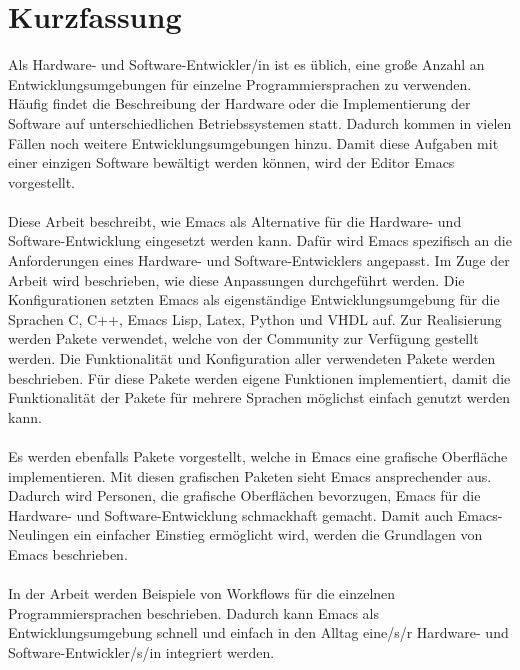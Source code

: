 \chapter{Kurzfassung}
\label{cha:kurzfassung}
Als Hardware- und Software-Entwickler/in ist es üblich, eine große
Anzahl an Entwicklungsumgebungen für einzelne Programmiersprachen zu
verwenden. Häufig findet die Beschreibung der Hardware oder die
Implementierung der Software auf unterschiedlichen Betriebssystemen
statt. Dadurch kommen in vielen Fällen noch weitere
Entwicklungsumgebungen hinzu. Damit diese Aufgaben mit einer einzigen
Software bewältigt werden können, wird der Editor Emacs
vorgestellt.\\\\ Diese Arbeit beschreibt, wie Emacs als Alternative
für die Hardware- und Software-Entwicklung eingesetzt werden
kann. Dafür wird Emacs spezifisch an die Anforderungen eines Hardware-
und Software-Entwicklers angepasst. Im Zuge der Arbeit wird
beschrieben, wie diese Anpassungen durchgeführt werden. Die
Konfigurationen setzten Emacs als eigenständige Entwicklungsumgebung
für die Sprachen C, C++, Emacs Lisp, Latex, Python und VHDL auf. Zur
Realisierung werden Pakete verwendet, welche von der Community zur
Verfügung gestellt werden. Die Funktionalität und Konfiguration aller
verwendeten Pakete werden beschrieben. Für diese Pakete werden eigene
Funktionen implementiert, damit die Funktionalität der Pakete für
mehrere Sprachen möglichst einfach genutzt werden kann.\\\\ Es werden
ebenfalls Pakete vorgestellt, welche in Emacs eine grafische
Oberfläche implementieren. Mit diesen grafischen Paketen sieht Emacs
ansprechender aus. Dadurch wird Personen, die grafische Oberflächen
bevorzugen, Emacs für die Hardware- und Software-Entwicklung
schmackhaft gemacht. Damit auch Emacs-Neulingen ein einfacher Einstieg
ermöglicht wird, werden die Grundlagen von Emacs beschrieben.\\\\ In
der Arbeit werden Beispiele von Workflows für die einzelnen
Programmiersprachen beschrieben. Dadurch kann Emacs als
Entwicklungsumgebung schnell und einfach in den Alltag eine/s/r
Hardware- und Software-Entwickler/s/in integriert werden.\\
